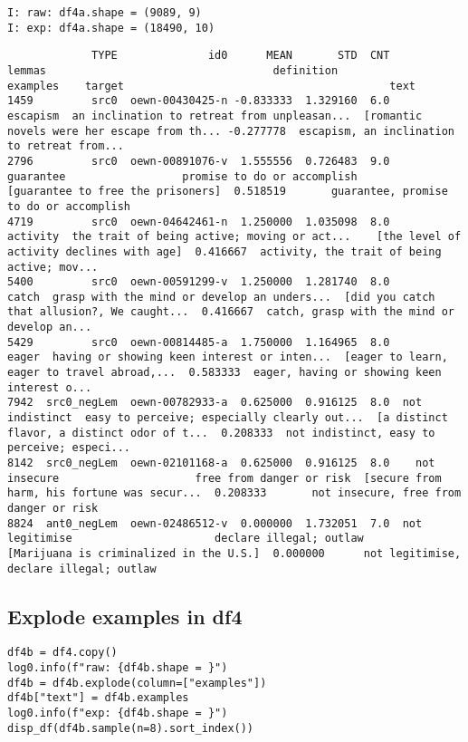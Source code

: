 \documentclass[a4paper,10pt,onecolumn,oneside,openright]{article}
\begin{document}
\begin{verbatim}
I: raw: df4a.shape = (9089, 9)
I: exp: df4a.shape = (18490, 10)
\end{verbatim}
\begin{verbatim}
             TYPE              id0      MEAN       STD  CNT          lemmas                                   definition                                     examples    target                                         text
1459         src0  oewn-00430425-n -0.833333  1.329160  6.0        escapism  an inclination to retreat from unpleasan...  [romantic novels were her escape from th... -0.277778  escapism, an inclination to retreat from...
2796         src0  oewn-00891076-v  1.555556  0.726483  9.0       guarantee                  promise to do or accomplish            [guarantee to free the prisoners]  0.518519       guarantee, promise to do or accomplish
4719         src0  oewn-04642461-n  1.250000  1.035098  8.0        activity  the trait of being active; moving or act...    [the level of activity declines with age]  0.416667  activity, the trait of being active; mov...
5400         src0  oewn-00591299-v  1.250000  1.281740  8.0           catch  grasp with the mind or develop an unders...  [did you catch that allusion?, We caught...  0.416667  catch, grasp with the mind or develop an...
5429         src0  oewn-00814485-a  1.750000  1.164965  8.0           eager  having or showing keen interest or inten...  [eager to learn, eager to travel abroad,...  0.583333  eager, having or showing keen interest o...
7942  src0_negLem  oewn-00782933-a  0.625000  0.916125  8.0  not indistinct  easy to perceive; especially clearly out...  [a distinct flavor, a distinct odor of t...  0.208333  not indistinct, easy to perceive; especi...
8142  src0_negLem  oewn-02101168-a  0.625000  0.916125  8.0    not insecure                     free from danger or risk  [secure from harm, his fortune was secur...  0.208333       not insecure, free from danger or risk
8824  ant0_negLem  oewn-02486512-v  0.000000  1.732051  7.0  not legitimise                      declare illegal; outlaw      [Marijuana is criminalized in the U.S.]  0.000000      not legitimise, declare illegal; outlaw
\end{verbatim}
\subsection{Explode examples in df4}
\label{sec:orga8b0d00}
\begin{verbatim}
df4b = df4.copy()
log0.info(f"raw: {df4b.shape = }")
df4b = df4b.explode(column=["examples"])
df4b["text"] = df4b.examples
log0.info(f"exp: {df4b.shape = }")
disp_df(df4b.sample(n=8).sort_index())
\end{verbatim}
\end{document}

